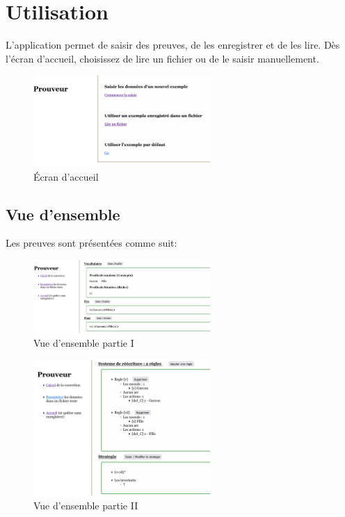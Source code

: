 \documentclass[11pt,a4paper]{article}
\begin{document}
\section{Utilisation}
L'application permet de saisir des preuves, de les enregistrer et de les lire. Dès l'écran d'accueil, choisissez de lire un fichier ou de le saisir manuellement.
\begin{figure}[htbp]
  \centering
  \includegraphics[width=0.6\textwidth]{screen4.png}
  \caption{Écran d'accueil}
  \label{fig:mon_image}
\end{figure}
\subsection{Vue d'ensemble}
Les preuves sont présentées comme suit:
\begin{figure}[htbp]
  \centering
  \includegraphics[width=0.6\textwidth]{screen5.png}
  \caption{Vue d'ensemble partie I}
  \label{fig:mon_image}
\end{figure}
\begin{figure}[htbp]
  \centering
  \includegraphics[width=0.6\textwidth]{screen6.png}
  \caption{Vue d'ensemble partie II}
  \label{fig:mon_image}
\end{figure}
\end{document}
